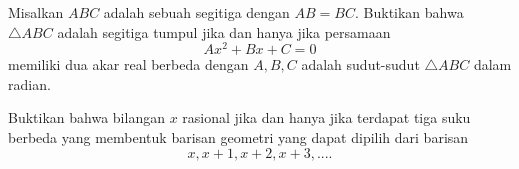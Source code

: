 \documentclass[11pt]{scrartcl}
\begin{document}
\begin{problem}
    Misalkan $ABC$ adalah sebuah segitiga dengan $AB = BC$. Buktikan bahwa $\triangle ABC$ adalah segitiga tumpul jika dan hanya jika persamaan $$Ax^2 + Bx +C = 0$$ memiliki dua akar real berbeda dengan $A, B, C$ adalah sudut-sudut $\triangle ABC$ dalam radian.
\end{problem}
\begin{problem}
    Buktikan bahwa bilangan $x$ rasional jika dan hanya jika terdapat tiga suku berbeda yang membentuk barisan geometri yang dapat dipilih dari barisan $$x, x + 1, x+2,x+3,....$$
\end{problem}
\end{document}
